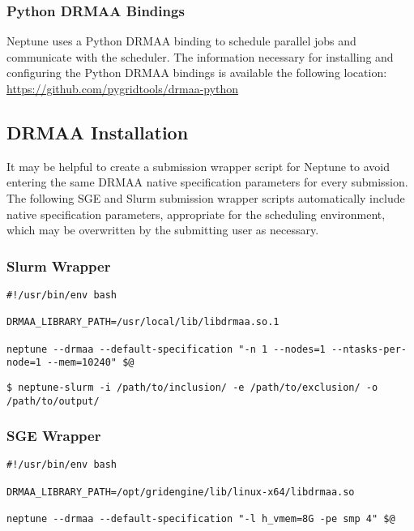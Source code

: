 \documentclass[a4paper,10pt]{article}
\begin{document}
\subsubsection{Python DRMAA Bindings}

Neptune uses a Python DRMAA binding to schedule parallel jobs and communicate with the scheduler. The information necessary for installing and configuring the Python DRMAA bindings is available the following location:
\newline\newline
\url{https://github.com/pygridtools/drmaa-python}

\subsection{DRMAA Installation}

It may be helpful to create a submission wrapper script for Neptune to avoid entering the same DRMAA native specification parameters for every submission. The following SGE and Slurm submission wrapper scripts automatically include native specification parameters, appropriate for the scheduling environment, which may be overwritten by the submitting user as necessary.

\subsubsection{Slurm Wrapper}

\begin{lstlisting}[title={neptune-slurm}]
#!/usr/bin/env bash

DRMAA_LIBRARY_PATH=/usr/local/lib/libdrmaa.so.1

neptune --drmaa --default-specification "-n 1 --nodes=1 --ntasks-per-node=1 --mem=10240" $@
\end{lstlisting}

\begin{lstlisting}[title={Slurm Example}]
$ neptune-slurm -i /path/to/inclusion/ -e /path/to/exclusion/ -o /path/to/output/
\end{lstlisting}

\subsubsection{SGE Wrapper}

\begin{lstlisting}[title={neptune-sge}]
#!/usr/bin/env bash

DRMAA_LIBRARY_PATH=/opt/gridengine/lib/linux-x64/libdrmaa.so

neptune --drmaa --default-specification "-l h_vmem=8G -pe smp 4" $@
\end{lstlisting}
\end{document}
